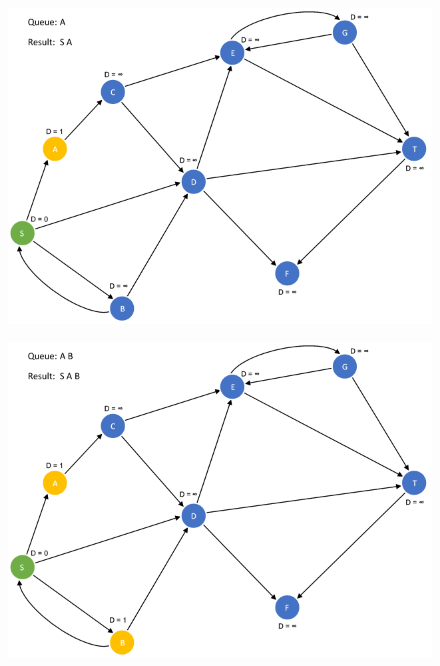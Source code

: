 \documentclass{article}
\begin{document}
\begin{figure}[H]
\centering
\includegraphics[scale=0.6]{images/Q4/02.png}
\end{figure}

\begin{figure}[H]
\centering
\includegraphics[scale=0.6]{images/Q4/03.png}
\end{figure}
\end{document}
